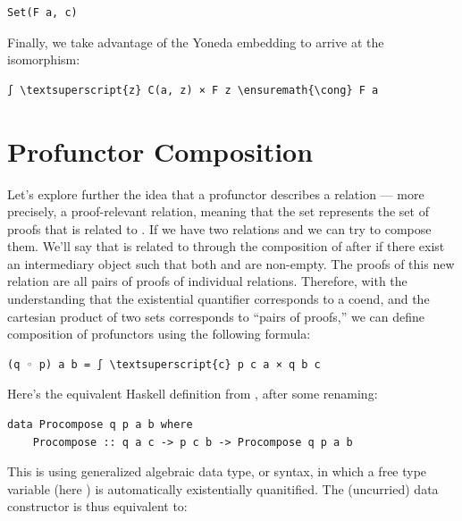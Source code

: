 \begin{verbatim}
Set(F a, c)
\end{verbatim}
Finally, we take advantage of the Yoneda embedding to arrive at the
isomorphism:

\begin{Verbatim}[commandchars=\\\{\}]
∫ \textsuperscript{z} C(a, z) × F z \ensuremath{\cong} F a
\end{Verbatim}

\section{Profunctor Composition}\label{profunctor-composition}

Let's explore further the idea that a profunctor describes a relation
--- more precisely, a proof-relevant relation, meaning that the set
 represents the set of proofs that  is related
to . If we have two relations  and  we can
try to compose them. We'll say that  is related to 
through the composition of  after  if there exist an
intermediary object  such that both  and
 are non-empty. The proofs of this new relation are all
pairs of proofs of individual relations. Therefore, with the
understanding that the existential quantifier corresponds to a coend,
and the cartesian product of two sets corresponds to ``pairs of
proofs,'' we can define composition of profunctors using the following
formula:

\begin{Verbatim}[commandchars=\\\{\}]
(q ◦ p) a b = ∫ \textsuperscript{c} p c a × q b c
\end{Verbatim}
Here's the equivalent Haskell definition from
, after some renaming:

\begin{verbatim}
data Procompose q p a b where
    Procompose :: q a c -> p c b -> Procompose q p a b 
\end{verbatim}
This is using generalized algebraic data type, or  syntax, in which
a free type variable (here ) is automatically existentially
quanitified. The (uncurried) data constructor  is
thus equivalent to:

